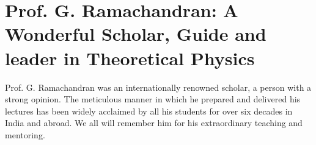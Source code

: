 \chapter{Prof. G. Ramachandran: A Wonderful Scholar, Guide and leader in Theoretical Physics}


\vspace{-.4cm}

Prof. G. Ramachandran was an internationally renowned scholar, a person with a strong opinion. The meticulous manner in which he prepared and delivered his lectures has been widely acclaimed by all his students for over six decades in India and abroad. We all will remember him for his extraordinary teaching and mentoring.

